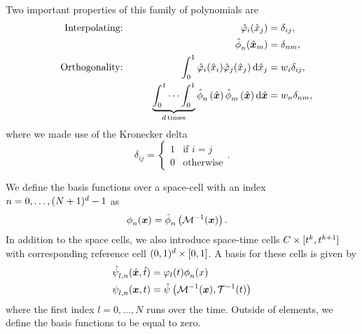Two important properties of this family of polynomials are
  \begin{alignat}{10}
    \label{eq:basis-interpolating}
&& \text{Interpolating:} \qquad && \lagrangeRef[i] (\quadNode[j]) &= \delta_{ij},\\
&& \qquad && \sbasisRef[][n] (\quadNodeNd[m]) &= \delta_{nm}, \notag\\
\label{eq:basis-orthogonality}
&& \text{Orthogonality:} \qquad && \int_0^1 \lagrangeRef[i](\quadNode[i]) \lagrangeRef[j](\quadNode[j]) \dd{\quadNode[j]} &= \quadWeight[i] \delta_{ij},\\
&& \qquad &&
\underbrace{\int_0^1 \cdots \int_0^1}_{d \,\text{times}}
\sbasisRef[][n] \left( \hat{\bm{x}} \right)
\sbasisRef[][m] \left( \hat{\bm{x}} \right) \dd{\hat{\bm{x}}}
&= \quadWeight[n] \delta_{nm}, \notag
    \end{alignat}
    where we made use of the Kronecker delta
\begin{equation}
      \label{eq:kronecker-delta}
      \delta_{ij} =
      \begin{cases}
        1 & \text{if } i = j\\
        0 & \text{otherwise}
      \end{cases}.
\end{equation}

We define the basis functions over a space-cell with an index $n = 0, \ldots, (N+1)^d - 1$ as
\begin{align}\label{eq:space-basis}
  \begin{split}
  \sbasis[][n] (\bm{x}) &= \sbasisRef[][n] \left( \mapping^{-1}(\bm{x}) \right).
  \end{split}
\end{align}
In addition to the space cells, we also introduce space-time cells $C_{} \times [t^k, t^{k+1}]$ with corresponding reference cell $(0,1)^d \times  [0,1]$.
A basis for these cells is given by
\begin{align}\label{eq:space-time-basis}
  \begin{split}
  \stbasisRef[][l,n](\hat{\bm{x}}, \hat{t}) &= \lagrange[l](t) \sbasis[][n] (x)\\
  \stbasis[][l,n] (\bm{x}, t) &= \stbasisRef \left( \mapping^{-1}(\bm{x}), \timeMapping^{-1}(t) \right)
  \end{split}
\end{align}
where the first index $l = 0, \ldots, N$ runs over the time.
Outside of elements, we define the basis functions to be equal to zero.

